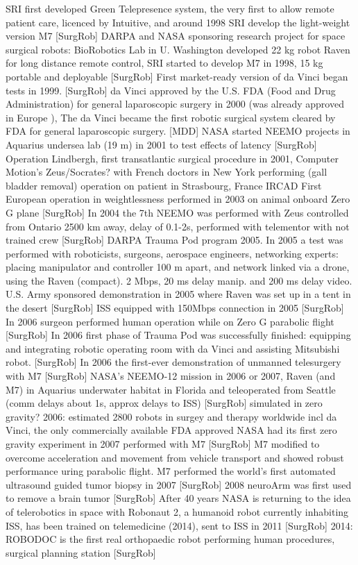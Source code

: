 SRI first developed Green Telepresence system, the very first to allow remote patient care, licenced by Intuitive, and around 1998 SRI develop the light-weight version M7 [SurgRob]
DARPA and NASA sponsoring research project for space surgical robots: BioRobotics Lab in U. Washington developed 22 kg robot Raven for long distance remote control, SRI started to develop M7 in 1998, 15 kg portable and deployable [SurgRob]
First market-ready version of da Vinci began tests in 1999. [SurgRob]
da Vinci approved by the U.S. FDA (Food and Drug Administration) for general laparoscopic surgery in 2000 (was already approved in Europe \citep{bib:intuitive_monopoly}), The da Vinci became the first robotic surgical system cleared by FDA for general laparoscopic surgery. [MDD]
NASA started NEEMO projects in Aquarius undersea lab (19 m) in 2001 to test effects of latency [SurgRob]
Operation Lindbergh, first transatlantic surgical procedure in 2001, Computer Motion's Zeus/Socrates? with French doctors in New York performing (gall bladder removal) operation on patient in Strasbourg, France IRCAD
First European operation in weightlessness performed in 2003 on animal onboard Zero G plane [SurgRob]
In 2004 the 7th NEEMO was performed with Zeus controlled from Ontario 2500 km away, delay of 0.1-2s, performed with telementor with not trained crew [SurgRob]
DARPA Trauma Pod program 2005.
In 2005 a test was performed with roboticists, surgeons, aerospace engineers, networking experts: placing manipulator and controller 100 m apart, and network linked via a drone, using the Raven \citep{bib:docatadist} (compact). 2 Mbps, 20 ms delay manip. and 200 ms delay video. U.S. Army sponsored demonstration in 2005 where Raven was set up in a tent in the desert [SurgRob]
ISS equipped with 150Mbps connection in 2005 [SurgRob]
In 2006 surgeon performed human operation while on Zero G parabolic flight [SurgRob] 
In 2006 first phase of Trauma Pod was successfully finished: equipping and integrating robotic operating room  with da Vinci and assisting Mitsubishi robot. [SurgRob]
In 2006 the first-ever demonstration of unmanned telesurgery with M7 [SurgRob]
NASA's NEEMO-12 mission in 2006 or 2007, Raven (and M7) in Aquarius underwater habitat in Florida and teleoperated from Seattle (comm delays about 1s, approx delays to ISS) [SurgRob] simulated in zero gravity?
2006: estimated 2800 robots in surgey and therapy worldwide incl da Vinci, the only commercially available FDA approved
NASA had its first zero gravity experiment in 2007 performed with M7 [SurgRob] M7 modified to overcome acceleration and movement from vehicle transport and showed robust performance uring parabolic flight.
M7 performed the world's first automated ultrasound guided tumor biopsy in 2007 [SurgRob]
2008 neuroArm was first used to remove a brain tumor [SurgRob]
After 40 years NASA is returning to the idea of telerobotics in space with Robonaut 2, a humanoid robot currently inhabiting ISS, has been trained on telemedicine (2014), sent to ISS in 2011 [SurgRob]
2014: ROBODOC is the first real orthopaedic robot performing human procedures, surgical planning station [SurgRob]

